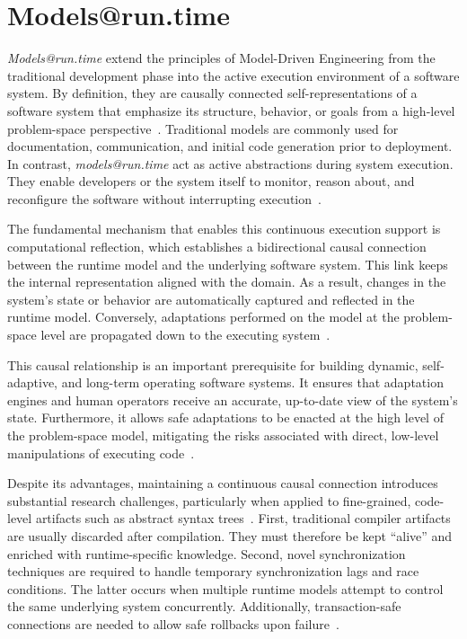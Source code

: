 \section{Models@run.time}
\label{sec:bg_models_at_runtime}

\textit{Models@run.time} extend the principles of Model-Driven Engineering from the traditional development phase into the active execution environment of a software system.
By definition, they are causally connected self-representations of a software system that emphasize its structure, behavior, or goals from a high-level problem-space perspective~\cite{blair_models_2009, bencomo_modelsruntime_2019}.
Traditional models are commonly used for documentation, communication, and initial code generation prior to deployment.
In contrast, \textit{models@run.time} act as active abstractions during system execution.
They enable developers or the system itself to monitor, reason about, and reconfigure the software without interrupting execution~\cite{blair_models_2009}.

The fundamental mechanism that enables this continuous execution support is computational reflection, which establishes a bidirectional causal connection between the runtime model and the underlying software system.
This link keeps the internal representation aligned with the domain.
As a result, changes in the system's state or behavior are automatically captured and reflected in the runtime model.
Conversely, adaptations performed on the model at the problem-space level are propagated down to the executing system~\cite{bencomo_modelsruntime_2019}.

This causal relationship is an important prerequisite for building dynamic, self-adaptive, and long-term operating software systems.
It ensures that adaptation engines and human operators receive an accurate, up-to-date view of the system's state.
Furthermore, it allows safe adaptations to be enacted at the high level of the problem-space model, mitigating the risks associated with direct, low-level manipulations of executing code~\cite{blair_models_2009, bencomo_modelsruntime_2019}.

Despite its advantages, maintaining a continuous causal connection introduces substantial research challenges, particularly when applied to fine-grained, code-level artifacts such as abstract syntax trees~\cite{schone_incremental_2016}.
First, traditional compiler artifacts are usually discarded after compilation.
They must therefore be kept ``alive'' and enriched with runtime-specific knowledge.
Second, novel synchronization techniques are required to handle temporary synchronization lags and race conditions.
The latter occurs when multiple runtime models attempt to control the same underlying system concurrently.
Additionally, transaction-safe connections are needed to allow safe rollbacks upon failure~\cite{bencomo_modelsruntime_2019}.